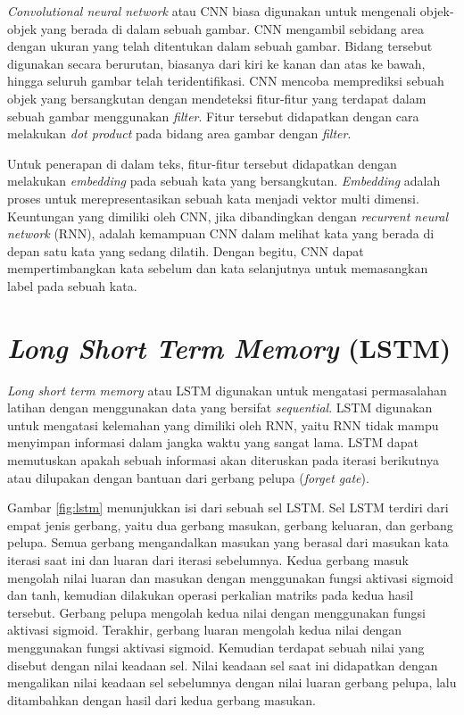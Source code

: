 \textit{Convolutional neural network} atau CNN biasa digunakan untuk mengenali objek-objek yang berada di dalam sebuah gambar. CNN mengambil sebidang area dengan ukuran yang telah ditentukan dalam sebuah gambar. Bidang tersebut digunakan secara berurutan, biasanya dari kiri ke kanan dan atas ke bawah, hingga seluruh gambar telah teridentifikasi. CNN mencoba memprediksi sebuah objek yang bersangkutan dengan mendeteksi fitur-fitur yang terdapat dalam sebuah gambar menggunakan \textit{filter}. Fitur tersebut didapatkan dengan cara melakukan \textit{dot product} pada bidang area gambar dengan \textit{filter}.

Untuk penerapan di dalam teks, fitur-fitur tersebut didapatkan dengan melakukan \textit{embedding} pada sebuah kata yang bersangkutan. \textit{Embedding} adalah proses untuk merepresentasikan sebuah kata menjadi vektor multi dimensi. Keuntungan yang dimiliki oleh CNN, jika dibandingkan dengan \textit{recurrent neural network} (RNN), adalah kemampuan CNN dalam melihat kata yang berada di depan satu kata yang sedang dilatih. Dengan begitu, CNN dapat mempertimbangkan kata sebelum dan kata selanjutnya untuk memasangkan label pada sebuah kata.

\section{\textit{Long Short Term Memory} (LSTM)}

\textit{Long short term memory} atau LSTM digunakan untuk mengatasi permasalahan latihan dengan menggunakan data yang bersifat \textit{sequential}. LSTM digunakan untuk mengatasi kelemahan yang dimiliki oleh RNN, yaitu RNN tidak mampu menyimpan informasi dalam jangka waktu yang sangat lama. LSTM dapat memutuskan apakah sebuah informasi akan diteruskan pada iterasi berikutnya atau dilupakan dengan bantuan dari gerbang pelupa (\textit{forget gate}).

Gambar \ref{fig:lstm} menunjukkan isi dari sebuah sel LSTM. Sel LSTM terdiri dari empat jenis gerbang, yaitu dua gerbang masukan, gerbang keluaran, dan gerbang pelupa. Semua gerbang mengandalkan masukan yang berasal dari masukan kata iterasi saat ini dan luaran dari iterasi sebelumnya. Kedua gerbang masuk mengolah nilai luaran dan masukan dengan menggunakan fungsi aktivasi sigmoid dan tanh, kemudian dilakukan operasi perkalian matriks pada kedua hasil tersebut. Gerbang pelupa mengolah kedua nilai dengan menggunakan fungsi aktivasi sigmoid. Terakhir, gerbang luaran mengolah kedua nilai dengan menggunakan fungsi aktivasi sigmoid. Kemudian terdapat sebuah nilai yang disebut dengan nilai keadaan sel. Nilai keadaan sel saat ini didapatkan dengan mengalikan nilai keadaan sel sebelumnya dengan nilai luaran gerbang pelupa, lalu ditambahkan dengan hasil dari kedua gerbang masukan.

